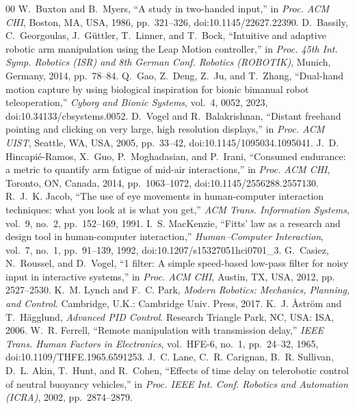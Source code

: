 \documentclass[5p,twocolumn]{elsarticle}
\begin{document}
\begin{thebibliography}{00}
 W.~Buxton and B.~Myers, ``A study in two-handed input,'' in \emph{Proc. ACM CHI}, Boston, MA, USA, 1986, pp.~321--326, doi:10.1145/22627.22390.
 D.~Bassily, C.~Georgoulas, J.~G{\"u}ttler, T.~Linner, and T.~Bock, ``Intuitive and adaptive robotic arm manipulation using the Leap Motion controller,'' in \emph{Proc. 45th Int. Symp. Robotics (ISR) and 8th German Conf. Robotics (ROBOTIK)}, Munich, Germany, 2014, pp.~78--84.
 Q.~Gao, Z.~Deng, Z.~Ju, and T.~Zhang, ``Dual-hand motion capture by using biological inspiration for bionic bimanual robot teleoperation,'' \emph{Cyborg and Bionic Systems}, vol.~4, 0052, 2023, doi:10.34133/cbsystems.0052.
 D.~Vogel and R.~Balakrishnan, ``Distant freehand pointing and clicking on very large, high resolution displays,'' in \emph{Proc. ACM UIST}, Seattle, WA, USA, 2005, pp.~33--42, doi:10.1145/1095034.1095041.
 J.~D. Hincapi{\'e}-Ramos, X.~Guo, P.~Moghadasian, and P.~Irani, ``Consumed endurance: a metric to quantify arm fatigue of mid-air interactions,'' in \emph{Proc. ACM CHI}, Toronto, ON, Canada, 2014, pp.~1063--1072, doi:10.1145/2556288.2557130.
 R.~J.~K. Jacob, ``The use of eye movements in human-computer interaction techniques: what you look at is what you get,'' \emph{ACM Trans. Information Systems}, vol.~9, no.~2, pp.~152--169, 1991.
 I.~S. MacKenzie, ``Fitts' law as a research and design tool in human-computer interaction,'' \emph{Human--Computer Interaction}, vol.~7, no.~1, pp.~91--139, 1992, doi:10.1207/s15327051hci0701\_3.
 G.~Casiez, N.~Roussel, and D.~Vogel, ``1\texteuro{} filter: A simple speed-based low-pass filter for noisy input in interactive systems,'' in \emph{Proc. ACM CHI}, Austin, TX, USA, 2012, pp. 2527--2530.
 K.~M. Lynch and F.~C. Park, \emph{Modern Robotics: Mechanics, Planning, and Control}. Cambridge, U.K.: Cambridge Univ. Press, 2017.
 K.~J. {\AA}str{\"o}m and T.~H{\"a}gglund, \emph{Advanced PID Control}. Research Triangle Park, NC, USA: ISA, 2006.
 W.~R. Ferrell, ``Remote manipulation with transmission delay,'' \emph{IEEE Trans. Human Factors in Electronics}, vol.~HFE-6, no.~1, pp.~24--32, 1965, doi:10.1109/THFE.1965.6591253.
 J.~C. Lane, C.~R. Carignan, B.~R. Sullivan, D.~L. Akin, T.~Hunt, and R.~Cohen, ``Effects of time delay on telerobotic control of neutral buoyancy vehicles,'' in \emph{Proc. IEEE Int. Conf. Robotics and Automation (ICRA)}, 2002, pp.~2874--2879.

\end{thebibliography}
\end{document}
